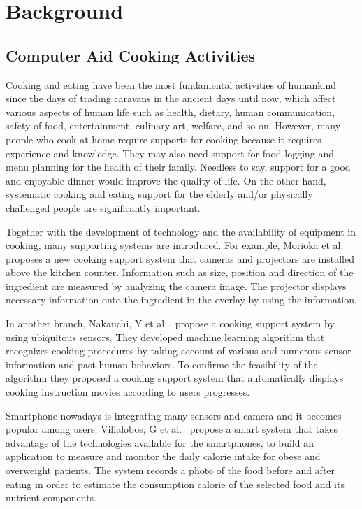 \chapter{Background}\label{chap:bg}

\section{Computer Aid Cooking Activities}

Cooking and eating have been the most fundamental activities of humankind since the days of trading caravans in the ancient days until now, which affect various aspects of human life such as health, dietary, human communication, safety of food, entertainment, culinary art, welfare, and so on. However, many people who cook at home require supports for cooking because it requires experience and knowledge. They may also need support for food-logging and menu planning for the health of their family. Needless to say, support for a good and enjoyable dinner would improve the quality of life. On the other hand, systematic cooking and eating support for the elderly and/or physically challenged people are significantly important.

Together with the development of technology and the availability of equipment in cooking, many supporting systems are introduced. For example, Morioka et al.~\cite{morioka:camera-projecter} proposes a new cooking support system that cameras and projectors are installed above the kitchen counter. Information such as size, position and direction of the ingredient are measured by analyzing the camera image. The projector displays necessary information onto the ingredient in the overlay by using the information.

In another branch, Nakauchi, Y et al.~\cite{nakauchi:recog} propose a cooking support system by using ubiquitous sensors. They developed machine learning algorithm that recognizes cooking procedures by taking account of various and numerous sensor information and past human behaviors. To confirme the feasibility of the algorithm they proposed a cooking support system that automatically displays cooking instruction movies according to users progresses. 

Smartphone nowadays is integrating many sensors and camera and it becomes popular among users. Villalobos, G et al.~\cite{villalobos:image-calorie} propose a smart system that takes advantage of the technologies available for the smartphones, to build an application to measure and monitor the daily calorie intake for obese and overweight patients. The system records a photo of the food before and after eating in order to estimate the consumption calorie of the selected food and its nutrient components.


